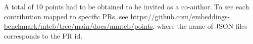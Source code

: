 A total of 10 points had to be obtained to be invited as a co-author. To see each contribution mapped to specific PRs, see \url{https://github.com/embeddings-benchmark/mteb/tree/main/docs/mmteb/points}, where the name of JSON files corresponds to the PR id.




